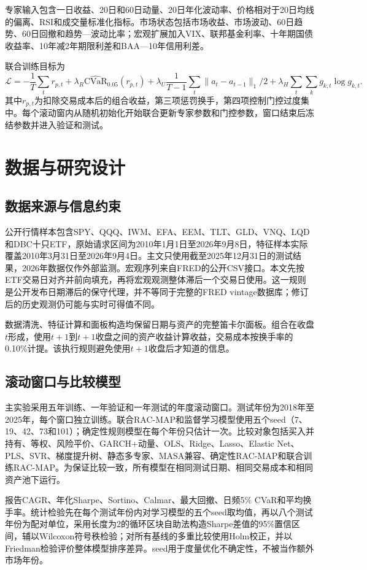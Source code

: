 \documentclass[UTF8,a4paper,zihao=-4]{ctexart}
\begin{document}
专家输入包含一日收益、20日和60日动量、20日年化波动率、价格相对于20日均线的偏离、RSI和成交量标准化指标。市场状态包括市场收益、市场波动、60日趋势、60日回撤和趋势—波动比率；宏观扩展加入VIX、联邦基金利率、十年期国债收益率、10年减2年期限利差和BAA—10年信用利差。

联合训练目标为
\begin{equation}
 \mathcal{L}= -\frac{1}{T}\sum_t r_{p,t}
 +\lambda_R\widehat{\mathrm{CVaR}}_{0.05}(r_{p,t})
 +\lambda_U\frac{1}{T-1}\sum_t\|a_t-a_{t-1}\|_1/2
 +\lambda_H\sum_t\sum_k g_{k,t}\log g_{k,t}.
\end{equation}
其中$r_{p,t}$为扣除交易成本后的组合收益，第三项惩罚换手，第四项控制门控过度集中。每个滚动窗内从随机初始化开始联合更新专家参数和门控参数，窗口结束后冻结参数并进入验证和测试。

\section{数据与研究设计}
\subsection{数据来源与信息约束}
公开行情样本包含SPY、QQQ、IWM、EFA、EEM、TLT、GLD、VNQ、LQD和DBC十只ETF，原始请求区间为2010年1月1日至2026年9月8日，特征样本实际覆盖2010年3月31日至2026年9月4日。主文只使用截至2025年12月31日的测试结果，2026年数据仅作外部监测。宏观序列来自FRED的公开CSV接口。本文先按ETF交易日对齐并前向填充，再将宏观观测整体滞后一个交易日使用。这一规则是公开发布日期滞后的保守代理，并不等同于完整的FRED vintage数据库；修订后的历史观测仍可能与实时可得值不同。

数据清洗、特征计算和面板构造均保留日期与资产的完整笛卡尔面板。组合在收盘$t$形成，使用$t+1$到$t+1$收盘之间的资产收益计算收益，交易成本按换手率的0.10\%计提。该执行规则避免使用$t+1$收盘后才知道的信息。

\subsection{滚动窗口与比较模型}
主实验采用五年训练、一年验证和一年测试的年度滚动窗口。测试年份为2018年至2025年，每个窗口独立训练。联合RAC-MAP和监督学习模型使用五个seed（7、19、42、73和101）；确定性规则模型在每个年份只估计一次。比较对象包括买入并持有、等权、风险平价、GARCH+动量、OLS、Ridge、Lasso、Elastic Net、PLS、SVR、梯度提升树、静态多专家、MASA兼容、确定性RAC-MAP和联合训练RAC-MAP。为保证比较一致，所有模型在相同测试日期、相同交易成本和相同资产池下运行。

报告CAGR、年化Sharpe、Sortino、Calmar、最大回撤、日频5\% CVaR和平均换手率。统计检验先在每个测试年份内对学习模型的五个seed取均值，再以八个测试年份为配对单位，采用长度为2的循环区块自助法构造Sharpe差值的95\%置信区间，辅以Wilcoxon符号秩检验；对所有基线的多重比较使用Holm校正，并以Friedman检验评价整体模型排序差异。seed用于度量优化不确定性，不被当作额外市场年份。
\end{document}
